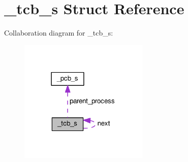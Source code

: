 \hypertarget{struct__tcb__s}{}\section{\+\_\+tcb\+\_\+s Struct Reference}
\label{struct__tcb__s}


Collaboration diagram for \+\_\+tcb\+\_\+s\+:\nopagebreak
\begin{figure}[H]
\begin{center}
\leavevmode
\includegraphics[width=174pt]{struct__tcb__s__coll__graph}
\end{center}
\end{figure}
